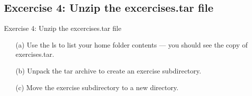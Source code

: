 \subsection{Excercise 4: Unzip the excercises.tar file}
\begin{frame}{Exercise 4: Unzip the excercises.tar file}
  \begin{itemize}

\item[(a)]{Use the \alert{ls} to list your home folder contents --- you should see the copy of exercises.tar.}

\item[(b)]{Unpack the tar archive to create an exercise subdirectory.}
\item[(c)]{Move the exercise subdirectory to a new directory.}
\end{itemize}
\end{frame}

